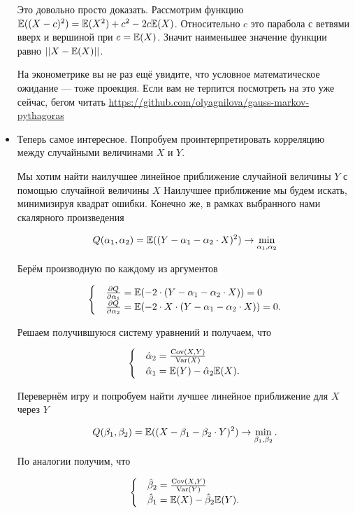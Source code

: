 \documentclass[12pt, a4paper, oneside]{article}
\begin{document}
\begin{itemize}
Это довольно просто доказать. Рассмотрим функцию $\mathbb{E}((X-c)^2)=\mathbb{E}(X^{2})+c^{2}-2c\mathbb{E}(X)$. Относительно $c$ это парабола с ветвями вверх и вершиной при $c=\mathbb{E}(X)$. Значит наименьшее значение функции равно $||X-\mathbb{E}(X)||$.

На эконометрике вы не раз ещё увидите, что условное математическое ожидание --- тоже проекция. Если вам не терпится посмотреть на это уже сейчас, бегом читать \href{виньетку про геометрию распределений. }{https://github.com/olyagnilova/gauss-markov-pythagoras}


\item Теперь самое интересное. Попробуем проинтерпретировать корреляцию между случайными величинами $X$ и $Y$.

Мы хотим найти наилучшее линейное приближение случайной величины $Y$ с помощью случайной величины $X$ Наилучшее приближение мы будем искать, минимизируя квадрат ошибки. Конечно же, в рамках выбранного нами скалярного произведения

\[
Q(\alpha_1, \alpha_2) = \mathbb{E}((Y - \alpha_1 - \alpha_2 \cdot X)^2) \to \min_{\alpha_1, \alpha_2}  
\]

Берём производную по каждому из аргументов

\begin{equation*} 
\begin{cases} 
& \frac{\partial Q}{\partial \alpha_1} = \mathbb{E}(-2 \cdot (Y - \alpha_1 - \alpha_2 \cdot X)) = 0 \\
& \frac{\partial Q}{\partial \alpha_2} = \mathbb{E}(-2 \cdot X \cdot (Y - \alpha_1 - \alpha_2 \cdot X)) = 0.
\end{cases} 
\end{equation*} 

Решаем получившуюся систему уравнений и получаем, что 

\begin{equation*} 
\begin{cases} 
& \hat{\alpha}_2 = \frac{\operatorname{Cov}(X, Y)}{\operatorname{Var}(X)} \\
& \hat{\alpha}_1 = \mathbb{E}(Y) - \hat{\alpha}_2 \mathbb{E}(X).
\end{cases} 
\end{equation*} 

Перевернём игру и попробуем найти лучшее линейное приближение для $X$ через $Y$

\[
Q(\beta_1, \beta_2) = \mathbb{E}((X - \beta_1 - \beta_2 \cdot Y)^2) \to \min_{\beta_1, \beta_2}.
\]

По аналогии получим, что 

\begin{equation*} 
\begin{cases} 
& \hat{\beta}_2 = \frac{\operatorname{Cov}(X, Y)}{\operatorname{Var}(Y)} \\
& \hat{\beta}_1 = \mathbb{E}(X) - \hat{\beta}_2 \mathbb{E}(Y).
\end{cases} 
\end{equation*} 


\end{itemize}
\end{document}
